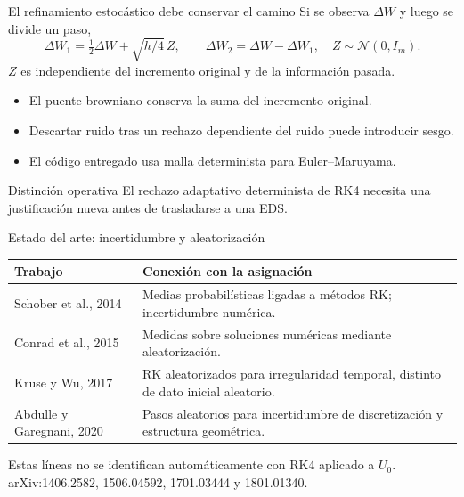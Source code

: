 \documentclass[aspectratio=169,11pt]{beamer}
\newcommand{\source}[1]{\vfill{\tiny\color{graytext}#1}}
\begin{document}
\begin{frame}{El refinamiento estocástico debe conservar el camino}
Si se observa $\Delta W$ y luego se divide un paso,
\[
\Delta W_1=\tfrac12\Delta W+\sqrt{h/4}\,Z,
\qquad \Delta W_2=\Delta W-\Delta W_1,
\quad Z\sim\mathcal N(0,I_m).
\]
$Z$ es independiente del incremento original y de la información pasada.
\begin{itemize}
\item El puente browniano conserva la suma del incremento original.
\item Descartar ruido tras un rechazo dependiente del ruido puede introducir sesgo.
\item El código entregado usa malla determinista para Euler--Maruyama.
\end{itemize}
\begin{block}{Distinción operativa}
El rechazo adaptativo determinista de RK4 necesita una justificación nueva
antes de trasladarse a una EDS.
\end{block}
\end{frame}

\begin{frame}{Estado del arte: incertidumbre y aleatorización}
\small\renewcommand{\arraystretch}{1.35}
\begin{tabularx}{0.98\linewidth}{@{}p{3.5cm}X@{}}\toprule
Trabajo & Conexión con la asignación\\\midrule
Schober et al., 2014 & Medias probabilísticas ligadas a métodos RK; incertidumbre numérica.\\
Conrad et al., 2015 & Medidas sobre soluciones numéricas mediante aleatorización.\\
Kruse y Wu, 2017 & RK aleatorizados para irregularidad temporal, distinto de dato inicial aleatorio.\\
Abdulle y Garegnani, 2020 & Pasos aleatorios para incertidumbre de discretización y estructura geométrica.\\\bottomrule
\end{tabularx}\par
\par\vspace{0.3cm}
\small Estas líneas no se identifican automáticamente con RK4 aplicado a $U_0$.
\source{arXiv:1406.2582, 1506.04592, 1701.03444 y 1801.01340.}
\end{frame}
\end{document}

